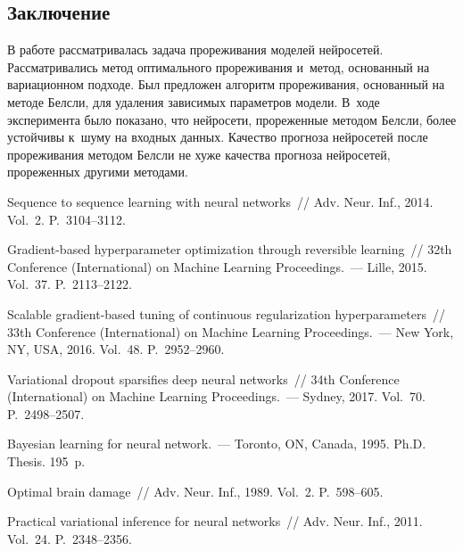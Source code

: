 \begin{multicols}{2}
\section{Заключение}

В работе рассматривалась задача прореживания моделей нейросетей. Рассматривались 
метод оптимального прореживания и~метод, основанный на вариационном подходе. Был 
предложен алгоритм прореживания, основанный на методе Белсли, для удаления 
зависимых параметров модели. В~ходе эксперимента было показано, что нейросети, 
прореженные методом Белсли, более устойчивы к~шуму на входных данных. Качество 
прогноза нейросетей после прореживания методом Белсли не хуже качества прогноза 
нейросетей, прореженных другими методами.




 {\small\frenchspacing
 {%
 \begin{thebibliography}{99}

    Sequence to sequence learning 
with neural networks~// Adv. Neur. Inf., 2014. 
Vol.~2. P.~3104--3112.
    
     Gradient-based hyperparameter 
optimization through reversible learning~//  32th 
 Conference (International) on Machine Learning Proceedings.~---
 Lille, 2015. Vol.~37. P.~2113--2122.
        
 Scalable gradient-based 
tuning of continuous regularization hyperparameters~//  
33th  Conference (International) 
on Machine Learning Proceedings.~--- New York, NY, USA, 2016. Vol.~48. P.~2952--2960.

     Variational dropout 
sparsifies deep neural networks~// 34th Conference 
(International) on Machine Learning Proceedings.~--- Sydney, 2017. Vol.~70. P.~2498--2507.

     Bayesian learning for neural network.~--- 
    Toronto, ON, Canada, 1995.  Ph.D. Thesis. 195~p.
    
    Optimal brain damage~// Adv. 
Neur. Inf., 1989. Vol.~2. P.~598--605.

     Practical variational inference for neural networks~// 
Adv. Neur. Inf., 2011. Vol.~24. P.~2348--2356.
    

\end{thebibliography}}}
\end{multicols}
